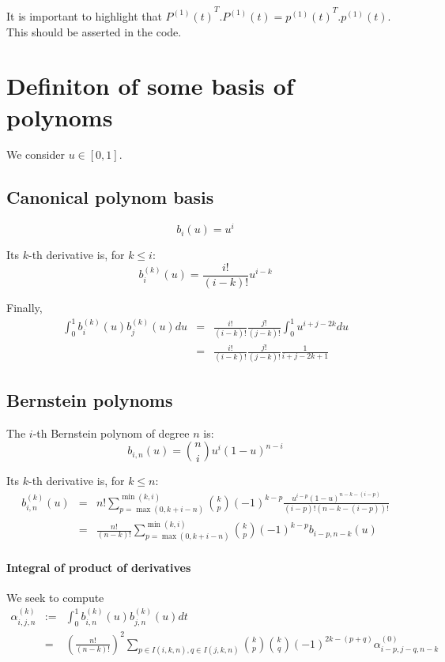 \documentclass {article}
\newcommand\bernstein[2]{b_{#1, #2}}
\begin{document}
It is important to highlight that
$ {P^{(1)} (t)}^T . P^{(1)} (t) = {p^{(1)} (t)}^T . p^{(1)} (t) $.
This should be asserted in the code.

\section{Definiton of some basis of polynoms}

We consider $u \in \left[ 0,1 \right]$.

\subsection {Canonical polynom basis}

$$
b_i(u) = u^i
$$

Its $k$-th derivative is, for $k \le i$:
$$
b_i^{(k)} (u) = \frac{i!}{(i-k)!} u^{i-k}
$$

Finally,
\begin{eqnarray*}
\int_0^1 b_i^{(k)} (u) b_j^{(k)} (u) du
&=& \frac{i!}{(i-k)!} \frac{j!}{(j-k)!} \int_0^1 u^{i+j-2k} du \\
&=& \frac{i!}{(i-k)!} \frac{j!}{(j-k)!} \frac{1}{i+j-2k+1}
\end{eqnarray*}

\subsection {Bernstein polynoms}
The $i$-th Bernstein polynom of degree $n$ is:
$$
\bernstein{i}{n} (u) = { n \choose i } u^i (1-u)^{n-i}
$$

Its $k$-th derivative is, for $k \le n$:
\begin{eqnarray*}
\bernstein{i}{n}^{(k)} (u) &=& n! \sum_{p = \max(0, k+i-n)}^{\min(k,i)} { k \choose p } (-1)^{k-p} \frac{u^{i-p} (1-u)^{n-k-(i-p)}}{(i-p)!(n-k-(i-p))!} \\
&=& \frac{n!}{(n-k)!} \sum_{p = \max(0, k+i-n)}^{\min(k,i)} { k \choose p } (-1)^{k-p} \bernstein{i-p}{n-k}(u)
\end{eqnarray*}

\paragraph{Integral of product of derivatives}
We seek to compute
\begin{eqnarray*}
  \alpha_{i,j,n}^{(k)} &:=& \int_0^1 \bernstein{i}{n}^{(k)}(u) \bernstein{j}{n}^{(k)} (u) dt \\
& =& \left(\frac{n!}{(n-k)!}\right)^2 \sum_{p \in I(i,k,n), q \in I(j,k,n)} { k \choose p } { k \choose q } (-1)^{2k - (p+q)} \alpha_{i-p,j-q,n-k}^{(0)} \\
\end{eqnarray*}
\end{document}
